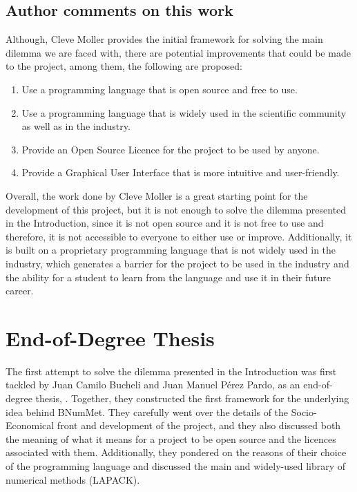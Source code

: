 \subsection{Author comments on this work}
Although, Cleve Moller provides the initial framework for solving the main dilemma we are faced with, there are potential improvements that could be made to the project, among them, the following are proposed:

\begin{enumerate}
    \item Use a programming language that is open source and free to use.
    \item Use a programming language that is widely used in the scientific community as well as in the industry.
    \item Provide an Open Source Licence for the project to be used by anyone.
    \item Provide a Graphical User Interface that is more intuitive and user-friendly.
\end{enumerate}


Overall, the work done by Cleve Moller is a great starting point for the development of this project, but it is not enough to solve the dilemma presented in the Introduction, since it is not open source and it is not free to use and therefore, it is not accessible to everyone to either use or improve. Additionally, it is built on a proprietary programming language that is not widely used in the industry, which generates a barrier for the project to be used in the industry and the ability for a student to learn from the language and use it in their future career.


\section{End-of-Degree Thesis}
The first attempt to solve the dilemma presented in the Introduction was first tackled by Juan Camilo Bucheli and Juan Manuel Pérez Pardo, as an end-of-degree thesis, \cite{bucheli2020}. Together, they constructed the first framework for the underlying idea behind BNumMet.
They carefully went over the details of the Socio-Economical front and development of the project, and they also discussed both the meaning of what it means for a project to be open source and the licences associated with them. Additionally, they pondered on the reasons of their choice of the programming language and discussed the main and widely-used library of numerical methods (LAPACK).

